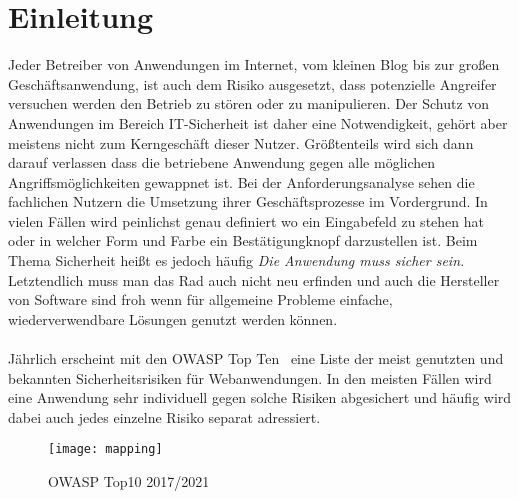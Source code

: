\chapter{Einleitung}


Jeder Betreiber von Anwendungen im Internet, vom kleinen Blog bis zur großen Geschäftsanwendung, ist auch dem Risiko ausgesetzt, dass potenzielle Angreifer versuchen werden den Betrieb zu stören oder zu manipulieren. Der Schutz von Anwendungen im Bereich IT-Sicherheit ist daher eine Notwendigkeit, gehört aber meistens nicht zum Kerngeschäft dieser Nutzer. Größtenteils wird sich dann darauf verlassen dass die betriebene Anwendung gegen alle möglichen Angriffsmöglichkeiten gewappnet ist. Bei der Anforderungsanalyse sehen die fachlichen Nutzern die Umsetzung ihrer Geschäftsprozesse im Vordergrund. In vielen Fällen wird peinlichst genau definiert wo ein Eingabefeld zu stehen hat oder in welcher Form und Farbe ein Bestätigungknopf darzustellen ist. Beim Thema Sicherheit heißt es jedoch häufig \glqq\emph{Die Anwendung muss sicher sein.}\grqq \\
Letztendlich muss man das Rad auch nicht neu erfinden und auch die Hersteller von Software sind froh wenn für allgemeine Probleme einfache, wiederverwendbare Lösungen genutzt werden können. \\\\

Jährlich erscheint mit den OWASP Top Ten~\cite{owasp10}  eine Liste der meist genutzten und bekannten Sicherheitsrisiken für Webanwendungen. In den meisten Fällen wird eine Anwendung sehr individuell gegen solche Risiken abgesichert und häufig wird dabei auch jedes einzelne Risiko separat adressiert. \\


\begin{figure}[bht]
  \begin{center}
    \texttt{[image: mapping]}
    \caption{OWASP Top10 2017/2021~\cite{owasp10}}
    \label{fig.topten}
  \end{center}
\end{figure}

